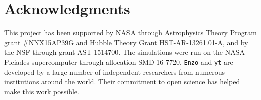 \documentclass[iop,apjl, twocolappendix]{emulateapj}   %
\begin{document}

\acknowledgments
\section{Acknowledgments}
\label{sec:acknowledgments}
This project has been supported by NASA through Astrophysics Theory Program
grant \#NNX15AP39G and Hubble Theory Grant HST-AR-13261.01-A, and by the
NSF through grant AST-1514700.  The simulations were run on the NASA
Pleiades supercomputer through allocation SMD-16-7720.  \texttt{Enzo} and
\texttt{yt} are developed by a large number of independent researchers from
numerous institutions around the world. Their commitment to open science
has helped make this work possible.

%



\end{document}
